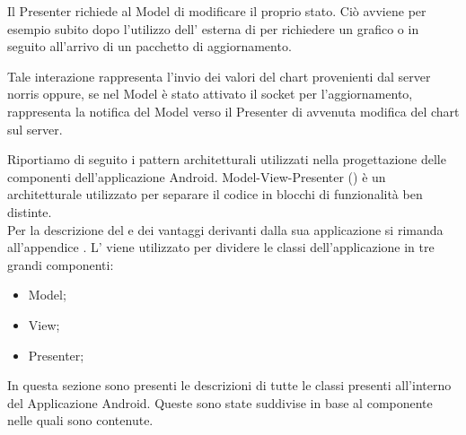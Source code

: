         Il Presenter richiede al Model di modificare il proprio stato. Ciò avviene per esempio subito dopo l'utilizzo dell' esterna di  per richiedere un grafico o in seguito all'arrivo di un pacchetto di aggiornamento.

        Tale interazione rappresenta l'invio dei valori del chart provenienti dal server norris oppure, se nel Model è stato attivato il socket per l'aggiornamento, rappresenta la notifica del Model verso il Presenter di avvenuta modifica del chart sul server.

        
    Riportiamo di seguito i pattern architetturali utilizzati nella progettazione delle componenti dell'applicazione Android.
            Model-View-Presenter () è un  architetturale utilizzato per separare il codice in blocchi di funzionalità ben distinte.\\
            Per la descrizione del  e dei vantaggi derivanti dalla sua applicazione si rimanda all'appendice .
                L' viene utilizzato per dividere le classi dell'applicazione  in tre grandi componenti:
                \begin{itemize}
                    \item Model;
                    \item View;
                    \item Presenter;
                \end{itemize}

        In questa sezione sono presenti le descrizioni di tutte le classi presenti all'interno del  Applicazione Android. Queste sono state suddivise in base al componente nelle quali sono contenute.
        
        
    

